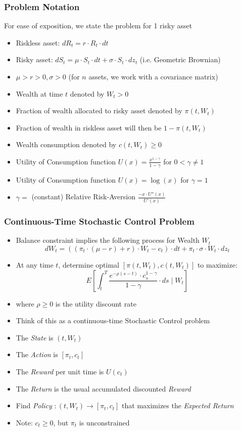 \documentclass[handout]{beamer}
\begin{document}
\begin{frame}
\frametitle{Problem Notation}
\pause
For ease of exposition, we state the problem for 1 risky asset
\pause
\begin{itemize}[<+->]
\item Riskless asset: $dR_t = r \cdot R_t \cdot dt$
\item Risky asset: $dS_t = \mu \cdot S_t \cdot dt + \sigma \cdot S_t \cdot dz_t$ (i.e. Geometric Brownian)
\item $\mu > r > 0, \sigma > 0$ (for $n$ assets, we work with a covariance matrix)
\item Wealth at time $t$ denoted by $W_t > 0$
\item Fraction of wealth allocated to risky asset denoted by $\pi(t, W_t)$
\item Fraction of wealth in riskless asset will then be $1 - \pi(t, W_t)$
\item Wealth consumption denoted by $c(t, W_t) \geq 0$
\item Utility of Consumption function $U(x) = \frac {x^{1-\gamma}} {1 - \gamma}$ for $0 < \gamma \neq 1$
\item Utility of Consumption function $U(x) = \log(x)$ for $\gamma = 1$
\item $\gamma =$ (constant) Relative Risk-Aversion $\frac {-x \cdot U''(x)} {U'(x)}$
\end{itemize}
\end{frame}

\begin{frame}
\frametitle{Continuous-Time Stochastic Control Problem}
\pause
\begin{itemize}[<+->]
\item Balance constraint implies the following process for Wealth $W_t$
$$dW_t = ((\pi_t \cdot (\mu - r) + r) \cdot W_t - c_t) \cdot dt + \pi_t \cdot \sigma \cdot W_t \cdot dz_t$$
\item At any time $t$, determine optimal $[\pi(t,W_t), c(t, W_t)]$ to maximize:
$$E[\int_t^T \frac {e^{-\rho (s-t)} \cdot c_s^{1-\gamma}} {1-\gamma} \cdot ds \mid W_t]$$
\item where $\rho \geq 0$ is the utility discount rate
\item Think of this as a continuous-time Stochastic Control problem
\item The {\em State} is $(t, W_t)$
\item The {\em Action} is $[\pi_t, c_t]$
\item The {\em Reward} per unit time is $U(c_t)$ 
\item The {\em Return} is the usual accumulated discounted {\em Reward}
\item Find {\em Policy} $: (t, W_t) \rightarrow [\pi_t, c_t]$ that maximizes the {\em Expected Return}
\item Note: $c_t \geq 0$, but $\pi_t$ is unconstrained
\end{itemize}
\end{frame}
\end{document}
